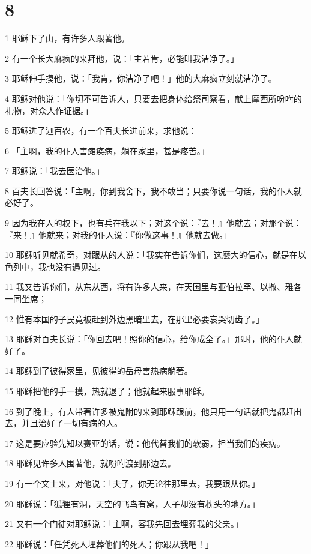\chapter{8}

\par 1 耶稣下了山，有许多人跟著他。
\par 2 有一个长大麻疯的来拜他，说：「主若肯，必能叫我洁净了。」
\par 3 耶稣伸手摸他，说：「我肯，你洁净了吧！」他的大麻疯立刻就洁净了。
\par 4 耶稣对他说：「你切不可告诉人，只要去把身体给祭司察看，献上摩西所吩咐的礼物，对众人作证据。」
\par 5 耶稣进了迦百农，有一个百夫长进前来，求他说：
\par 6 「主啊，我的仆人害瘫痪病，躺在家里，甚是疼苦。」
\par 7 耶稣说：「我去医治他。」
\par 8 百夫长回答说：「主啊，你到我舍下，我不敢当；只要你说一句话，我的仆人就必好了。
\par 9 因为我在人的权下，也有兵在我以下；对这个说：『去！』他就去；对那个说：『来！』他就来；对我的仆人说：『你做这事！』他就去做。」
\par 10 耶稣听见就希奇，对跟从的人说：「我实在告诉你们，这麽大的信心，就是在以色列中，我也没有遇见过。
\par 11 我又告诉你们，从东从西，将有许多人来，在天国里与亚伯拉罕、以撒、雅各一同坐席；
\par 12 惟有本国的子民竟被赶到外边黑暗里去，在那里必要哀哭切齿了。」
\par 13 耶稣对百夫长说：「你回去吧！照你的信心，给你成全了。」那时，他的仆人就好了。
\par 14 耶稣到了彼得家里，见彼得的岳母害热病躺著。
\par 15 耶稣把他的手一摸，热就退了；他就起来服事耶稣。
\par 16 到了晚上，有人带著许多被鬼附的来到耶稣跟前，他只用一句话就把鬼都赶出去，并且治好了一切有病的人。
\par 17 这是要应验先知以赛亚的话，说：他代替我们的软弱，担当我们的疾病。
\par 18 耶稣见许多人围著他，就吩咐渡到那边去。
\par 19 有一个文士来，对他说：「夫子，你无论往那里去，我要跟从你。」
\par 20 耶稣说：「狐狸有洞，天空的飞鸟有窝，人子却没有枕头的地方。」
\par 21 又有一个门徒对耶稣说：「主啊，容我先回去埋葬我的父亲。」
\par 22 耶稣说：「任凭死人埋葬他们的死人；你跟从我吧！」
